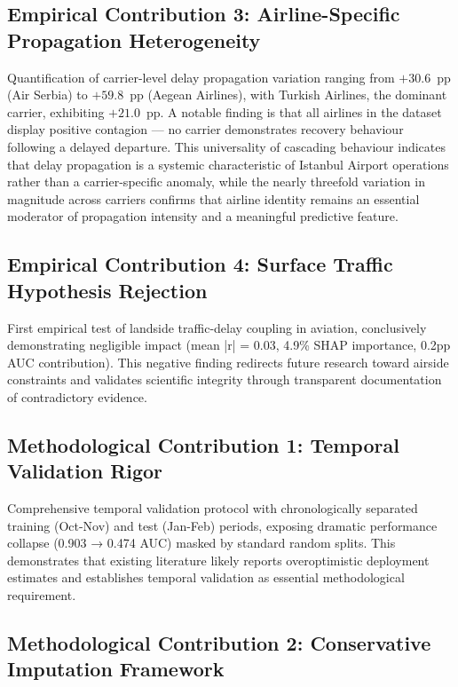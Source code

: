 \documentclass{report}
\begin{document}
\subsection{Empirical Contribution 3: Airline-Specific Propagation Heterogeneity}
Quantification of carrier-level delay propagation variation ranging from 
$+30.6$~pp (Air Serbia) to $+59.8$~pp (Aegean Airlines), with Turkish Airlines, 
the dominant carrier, exhibiting $+21.0$~pp. A notable finding is that all 
airlines in the dataset display positive contagion --- no carrier demonstrates 
recovery behaviour following a delayed departure. This universality of 
cascading behaviour indicates that delay propagation is a systemic 
characteristic of Istanbul Airport operations rather than a carrier-specific 
anomaly, while the nearly threefold variation in magnitude across carriers 
confirms that airline identity remains an essential moderator of propagation 
intensity and a meaningful predictive feature.

\subsection{Empirical Contribution 4: Surface Traffic Hypothesis Rejection}

First empirical test of landside traffic-delay coupling in aviation, conclusively demonstrating negligible impact (mean |r| = 0.03, 4.9\% SHAP importance, 0.2pp AUC contribution). This negative finding redirects future research toward airside constraints and validates scientific integrity through transparent documentation of contradictory evidence.

\subsection{Methodological Contribution 1: Temporal Validation Rigor}

Comprehensive temporal validation protocol with chronologically separated training (Oct-Nov) and test (Jan-Feb) periods, exposing dramatic performance collapse (0.903 → 0.474 AUC) masked by standard random splits. This demonstrates that existing literature likely reports overoptimistic deployment estimates and establishes temporal validation as essential methodological requirement.

\subsection{Methodological Contribution 2: Conservative Imputation Framework}
\end{document}

